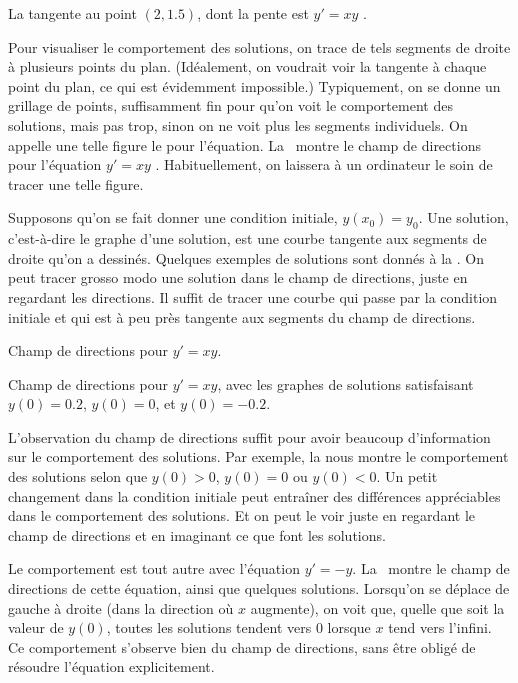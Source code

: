 \begin{myfig}
\capstart
{}
\caption{La  tangente au point $(2,1.5)$, dont la pente est $y'=xy$ .\label{1.3:fig0}}
\end{myfig}

Pour visualiser le comportement des solutions, on trace de tels segments de droite à plusieurs points du plan.  (Idéalement, on voudrait voir la tangente à chaque point du plan, ce qui est évidemment impossible.)  Typiquement, on se donne un grillage de points, suffisamment fin pour qu'on voit le comportement des solutions, mais pas trop, sinon on ne voit plus les segments individuels.  On appelle une telle figure le \emph{} pour l'équation.
La~ montre le champ de directions pour l'équation  $y' = xy$ .
Habituellement, on laissera à un ordinateur le soin de tracer une telle figure.

Supposons qu'on se fait donner une condition initiale, $y(x_0) = y_0$.  Une solution, c'est-à-dire le graphe d'une solution, est une courbe tangente aux segments de droite qu'on a dessinés.  Quelques exemples de solutions sont donnés à la  .  On peut tracer grosso modo une solution dans le champ de directions, juste en regardant les directions.  Il suffit de tracer une courbe qui passe par la condition initiale et qui est à peu près tangente aux segments du champ de directions.

\begin{myfig}
\parbox[t]{3.0in}{
 \capstart
 \caption{Champ de directions pour $y' = xy$.\label{1.3:fig1}}
}
\quad
\parbox[t]{3.0in}{
 \capstart
 \caption{Champ de directions pour $y' = xy$, avec les graphes de solutions satisfaisant $y(0) = 0.2$, $y(0) = 0$, et $y(0) = -0.2$.\label{1.3:fig2}}
}
\end{myfig}
L'observation du champ de directions suffit pour avoir beaucoup d'information sur le comportement des solutions.  Par exemple, la  nous montre le comportement des solutions selon que $y(0) > 0$, $y(0) = 0$ ou $y(0) < 0$.  Un petit changement dans la condition initiale peut entraîner des différences appréciables dans le comportement des solutions.  Et on peut le voir juste en regardant le champ de directions et en imaginant ce que font les solutions.

Le comportement est tout autre avec l'équation $y' = -y$.  La~ montre le champ de directions de cette équation, ainsi que quelques solutions.  Lorsqu'on se déplace de gauche à droite (dans la direction où $x$ augmente), on voit que, quelle que soit la valeur de $y(0)$, toutes les solutions tendent vers 0 lorsque $x$ tend vers l'infini.  Ce comportement s'observe bien du champ de directions, sans être obligé de résoudre l'équation explicitement.

